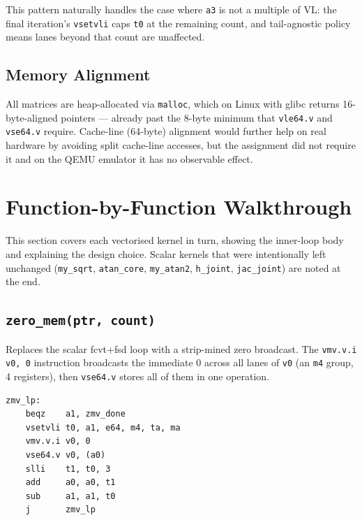 \documentclass[11pt,a4paper]{article}
\begin{document}
This pattern naturally handles the case where \texttt{a3} is not a
multiple of $\mathrm{VL}$: the final iteration's \texttt{vsetvli} caps
\texttt{t0} at the remaining count, and tail-agnostic policy means lanes
beyond that count are unaffected.

\subsection{Memory Alignment}

All matrices are heap-allocated via \texttt{malloc}, which on Linux with
glibc returns 16-byte-aligned pointers --- already past the 8-byte
minimum that \texttt{vle64.v} and \texttt{vse64.v} require. Cache-line
(64-byte) alignment would further help on real hardware by avoiding
split cache-line accesses, but the assignment did not require it and on
the QEMU emulator it has no observable effect.

\section{Function-by-Function Walkthrough}

This section covers each vectorised kernel in turn, showing the inner-loop
body and explaining the design choice. Scalar kernels that were intentionally
left unchanged (\texttt{my\_sqrt}, \texttt{atan\_core}, \texttt{my\_atan2},
\texttt{h\_joint}, \texttt{jac\_joint}) are noted at the end.

\subsection{\texttt{zero\_mem(ptr, count)}}

Replaces the scalar fcvt+fsd loop with a strip-mined zero broadcast. The
\texttt{vmv.v.i v0, 0} instruction broadcasts the immediate 0 across all
lanes of \texttt{v0} (an \texttt{m4} group, 4 registers), then \texttt{vse64.v}
stores all of them in one operation.

\begin{lstlisting}[caption={Vectorised zero\_mem inner loop}]
zmv_lp:
    beqz    a1, zmv_done
    vsetvli t0, a1, e64, m4, ta, ma
    vmv.v.i v0, 0
    vse64.v v0, (a0)
    slli    t1, t0, 3
    add     a0, a0, t1
    sub     a1, a1, t0
    j       zmv_lp
\end{lstlisting}
\end{document}
